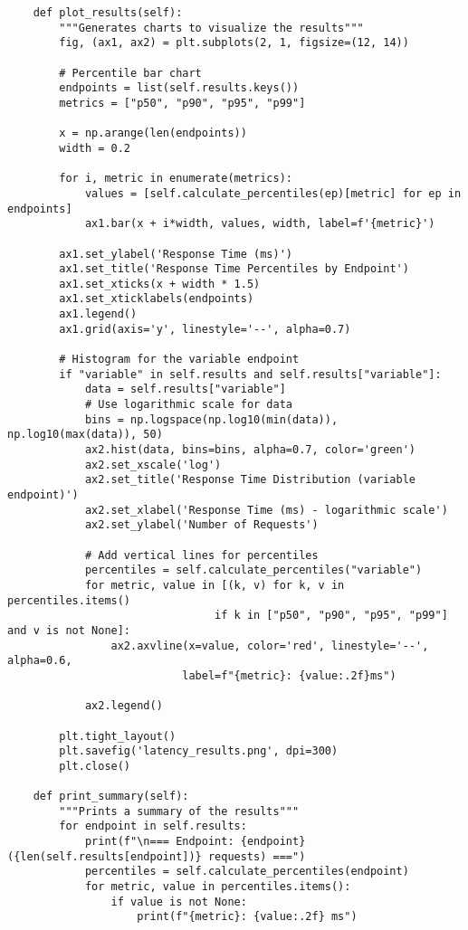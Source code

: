 \documentclass[12pt,letterpaper]{article}
\newenvironment{macterminal}{%
    \begin{mdframed}[
        linecolor=terminalFrame,
        backgroundcolor=terminalBg,
        roundcorner=5pt,
        skipabove=10pt,
        skipbelow=10pt,
        linewidth=1pt,
        innertopmargin=10pt, %
        frametitle={%
            \tikz[baseline=(current bounding box.east), outer sep=0pt]{
                \fill[red!80!black] (0,0) circle (5pt);
                \fill[yellow!80!black] (0.7,0) circle (5pt);
                \fill[green!70!black] (1.4,0) circle (5pt);
            }
        },
        frametitlealignment=\raggedright, %
        frametitleaboveskip=8pt, %
        frametitlebelowskip=0pt, %
    ]
}{%
    \end{mdframed}%
}
\begin{document}
\begin{macterminal}
\begin{lstlisting}
    def plot_results(self):
        """Generates charts to visualize the results"""
        fig, (ax1, ax2) = plt.subplots(2, 1, figsize=(12, 14))
        
        # Percentile bar chart
        endpoints = list(self.results.keys())
        metrics = ["p50", "p90", "p95", "p99"]
        
        x = np.arange(len(endpoints))
        width = 0.2
        
        for i, metric in enumerate(metrics):
            values = [self.calculate_percentiles(ep)[metric] for ep in endpoints]
            ax1.bar(x + i*width, values, width, label=f'{metric}')
        
        ax1.set_ylabel('Response Time (ms)')
        ax1.set_title('Response Time Percentiles by Endpoint')
        ax1.set_xticks(x + width * 1.5)
        ax1.set_xticklabels(endpoints)
        ax1.legend()
        ax1.grid(axis='y', linestyle='--', alpha=0.7)
        
        # Histogram for the variable endpoint
        if "variable" in self.results and self.results["variable"]:
            data = self.results["variable"]
            # Use logarithmic scale for data
            bins = np.logspace(np.log10(min(data)), np.log10(max(data)), 50)
            ax2.hist(data, bins=bins, alpha=0.7, color='green')
            ax2.set_xscale('log')
            ax2.set_title('Response Time Distribution (variable endpoint)')
            ax2.set_xlabel('Response Time (ms) - logarithmic scale')
            ax2.set_ylabel('Number of Requests')
            
            # Add vertical lines for percentiles
            percentiles = self.calculate_percentiles("variable")
            for metric, value in [(k, v) for k, v in percentiles.items() 
                                if k in ["p50", "p90", "p95", "p99"] and v is not None]:
                ax2.axvline(x=value, color='red', linestyle='--', alpha=0.6, 
                           label=f"{metric}: {value:.2f}ms")
            
            ax2.legend()
        
        plt.tight_layout()
        plt.savefig('latency_results.png', dpi=300)
        plt.close()
    
    def print_summary(self):
        """Prints a summary of the results"""
        for endpoint in self.results:
            print(f"\n=== Endpoint: {endpoint} ({len(self.results[endpoint])} requests) ===")
            percentiles = self.calculate_percentiles(endpoint)
            for metric, value in percentiles.items():
                if value is not None:
                    print(f"{metric}: {value:.2f} ms")


\end{lstlisting}
\end{macterminal}
\end{document}
